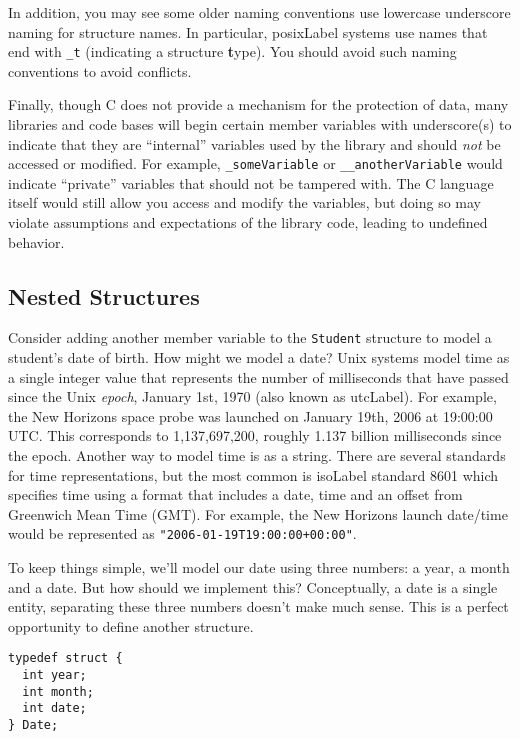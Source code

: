 In addition, you may see some older naming conventions use lowercase 
underscore naming for structure names.  In particular, \gls{posixLabel}
systems use names that end with \texttt{_t} (indicating
a structure \textbf{t}ype).  You should avoid such naming
conventions to avoid conflicts.

Finally, though C does not provide a mechanism for the protection of
data, many libraries and code bases will begin certain member variables
with underscore(s) to indicate that they are ``internal'' variables
used by the library and should \emph{not} be accessed or modified.
For example, \texttt{_someVariable} or \texttt{__anotherVariable} would indicate ``private'' variables that should
not be tampered with.  The C language itself would still allow you 
access and modify the variables, but doing so may violate assumptions
and expectations of the library code, leading to undefined behavior.

\subsection{Nested Structures}

Consider adding another member variable to the \texttt{Student}
structure to model a student's date of birth.  How might we model
a date?  Unix systems model time as a single integer value that
represents the number of milliseconds that have passed since the
Unix \emph{epoch}, January 1st, 1970 (also known as \gls{utcLabel}).  
For example, the New Horizons space probe
was launched on January 19th, 2006 at 19:00:00 UTC.  This corresponds
to 1,137,697,200, roughly 1.137 billion milliseconds since the
epoch.  Another way to model time is as a string.  There are several
standards for time representations, but the most common is \gls{isoLabel}
standard 8601 \cite{ISO:1988:IDE} which specifies time using a format that
includes a date, time and an offset from Greenwich Mean Time (GMT).
For example, the New Horizons launch date/time would be represented
as \texttt{"2006-01-19T19:00:00+00:00"}.

To keep things simple, we'll model our date using three numbers: a
year, a month and a date.  But how should we implement this?  
Conceptually, a date is a single entity, separating these three 
numbers doesn't make much sense.  This is a perfect opportunity to 
define another structure.

\begin{verbatim}
typedef struct {
  int year;
  int month;
  int date;
} Date;
\end{verbatim}


